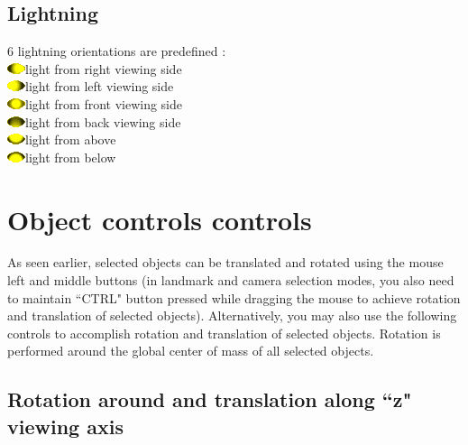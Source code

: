 \subsection{Lightning}
6 lightning orientations are predefined :\\
\includegraphics[scale=0.7]{images/pixmap/s_right_17.png}light from right viewing side\\
\includegraphics[scale=0.7]{images/pixmap/s_left_17.png}light from left viewing side\\
\includegraphics[scale=0.7]{images/pixmap/s_face_17.png}light from front viewing side\\
\includegraphics[scale=0.7]{images/pixmap/s_back_18.png}light from back viewing side\\
\includegraphics[scale=0.7]{images/pixmap/s_dessus_18.png}light from above\\
\includegraphics[scale=0.7]{images/pixmap/s_dessous_18.png}light from below\\

  \section{Object controls controls}
	As seen earlier, selected objects can be translated and rotated using the mouse left and middle buttons
(in landmark and camera selection modes, you also need to maintain ``CTRL" button pressed
while dragging the mouse to achieve rotation and translation of selected objects). Alternatively, you
may also use the following controls to accomplish rotation and translation of selected objects. Rotation
is performed around the global center of mass of all selected objects.

\subsection{Rotation around and translation along ``z" viewing axis}

